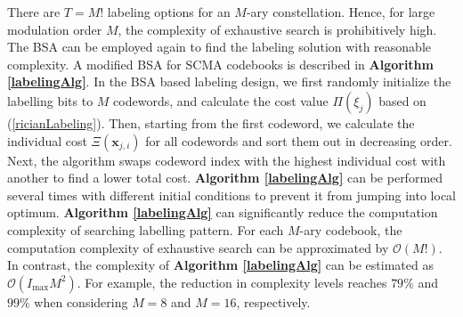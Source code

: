 \documentclass[journal]{IEEEtran}
\begin{document}
 There are    $T=M!$ labeling options for  an $M$-ary  constellation. Hence, for large modulation order $M$, the complexity of  exhaustive search is prohibitively high.   The BSA can be employed again to find the labeling solution with reasonable complexity. A modified BSA  for SCMA  codebooks is  described in \textbf{Algorithm \ref{labelingAlg}}. In  the BSA based labeling design, we first randomly initialize  the labelling bits to $M$ codewords, and calculate the cost value   $\Pi (\xi _{j})$  based on  (\ref{ricianLabeling}).  Then, starting  from the first codeword, we calculate the individual cost $\Xi (\mathbf {x}_{j,i})$ for all codewords and  sort  them out  in decreasing order.  Next, the algorithm swaps codeword index  with the highest individual cost with another  to find  a lower  total cost.      \textbf{Algorithm \ref{labelingAlg}} can be performed several times with different initial conditions to prevent it from jumping into local optimum.  \textbf{Algorithm \ref{labelingAlg}} can significantly reduce  the computation complexity of searching labelling pattern.  For each $M$-ary codebook,  the computation complexity of  exhaustive search  can be approximated by $\mathcal O \left( M !\right)$. In contrast, the  complexity of  \textbf{Algorithm \ref{labelingAlg}} can be estimated as $\mathcal O \left( I_{\text{max}} M^2\right)$. For example, the reduction in complexity levels reaches $79\%$ and $99\%$ when considering $M=8$ and $M=16$, respectively.
 
 





\end{document}
